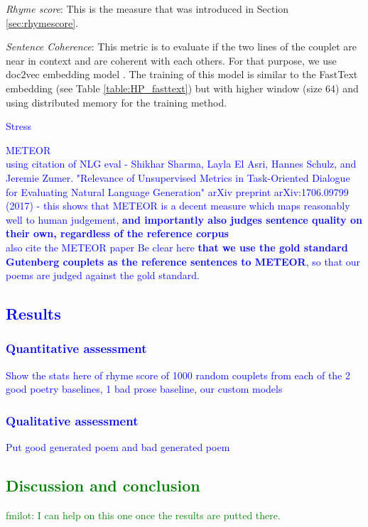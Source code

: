 \documentclass[11pt,a4paper]{article}
\begin{document}
\begin{itemize}
	\item \textit{Rhyme score}: This is the measure that was introduced in Section \ref{sec:rhymescore}.
	\item \textit{Sentence Coherence}: This metric is to evaluate if the two lines of the couplet are near in context and are coherent with each others. For that purpose, we use doc2vec embedding model \cite{docvec}. The training of this model is similar to the FastText embedding (see Table \ref{table:HP_fasttext}) but with higher window (size 64) and using distributed memory for the training method.
\textcolor{blue}{
	\item Stress 
	\item METEOR\\
		using citation of NLG eval - Shikhar Sharma, Layla El Asri, Hannes Schulz, and Jeremie Zumer. "Relevance of Unsupervised Metrics in Task-Oriented Dialogue for Evaluating Natural Language Generation" arXiv preprint arXiv:1706.09799 (2017) - this shows that METEOR is a decent measure which maps reasonably well to human judgement, \textbf{and importantly also judges sentence quality on their own, regardless of the reference corpus}\\
		also cite the METEOR paper
		Be clear here \textbf{that we use the gold standard Gutenberg couplets as the reference sentences to METEOR}, so that our poems are judged against the gold standard.
}
\end{itemize}



\textcolor{blue}{
\subsection{Results}
\label{sec:results}
\subsubsection{Quantitative assessment}
Show the stats here of rhyme score of 1000 random couplets from each of the 2 good poetry baselines, 1 bad prose baseline, our custom models
\subsubsection{Qualitative assessment}
Put good generated poem and bad generated poem
}

\textcolor{green}{
\section{Discussion and conclusion}
\label{sec:discconc}
fmilot: I can help on this one once the results are putted there.
}
\end{document}
